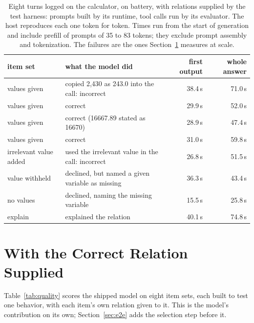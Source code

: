 \documentclass[10pt]{article}
\begin{document}
\begin{table}[t]
\caption{Eight turns logged on the calculator, on battery, with relations supplied by the test harness:
prompts built by its runtime, tool calls run by its evaluator. The host reproduces each one token for token.
Times run from the start of generation and include prefill of prompts of 35 to 83 tokens; they exclude
prompt assembly and tokenization. The failures are the ones
Section~\ref{sec:quality} measures at scale.}
\label{tab:turns}
\centering\footnotesize
\begin{tabular}{@{}llrr@{}}
\toprule
item set & what the model did & first output & whole answer \\
\midrule
values given & copied 2,430 as 243.0 into the call: incorrect & 38.4\,s & 71.0\,s \\
values given & correct & 29.9\,s & 52.0\,s \\
values given & correct (16667.89 stated as 16670) & 28.9\,s & 47.4\,s \\
values given & correct & 31.0\,s & 59.8\,s \\
irrelevant value added & used the irrelevant value in the call: incorrect & 26.8\,s & 51.5\,s \\
value withheld & declined, but named a given variable as missing & 36.3\,s & 43.4\,s \\
no values & declined, naming the missing variable & 15.5\,s & 25.8\,s \\
explain & explained the relation & 40.1\,s & 74.8\,s \\
\bottomrule
\end{tabular}
\end{table}

\section{With the Correct Relation Supplied}
\label{sec:quality}

Table~\ref{tab:quality} scores the shipped model on eight item sets, each built to test one behavior,
with each item's own relation given to it. This is the model's contribution on its own;
Section~\ref{sec:e2e} adds the selection step before it.
\end{document}
